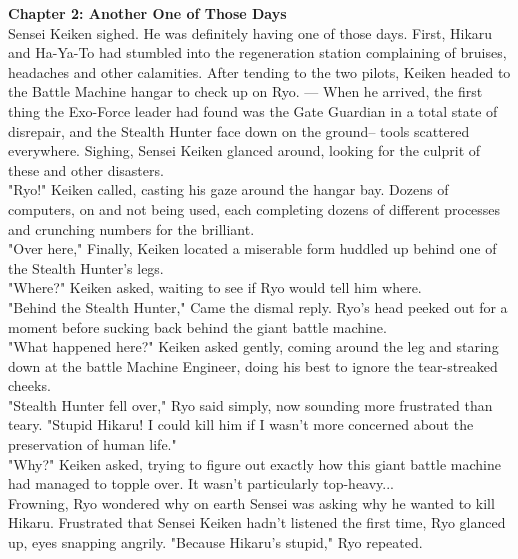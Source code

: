 \documentclass[11pt,twoside,a4paper]{book}
\begin{document}
\begin{multicols*}{2}

\textbf{\large Chapter 2: Another One of Those Days} ~\\

Sensei Keiken sighed. He was definitely having one of those days. First, Hikaru and Ha-Ya-To had stumbled into the regeneration station complaining of bruises, headaches and other calamities. After tending to the two pilots, Keiken headed to the Battle Machine hangar to check up on Ryo. --- When he arrived, the first thing the Exo-Force leader had found was the Gate Guardian in a total state of disrepair, and the Stealth Hunter face down on the ground-- tools scattered everywhere. Sighing, Sensei Keiken glanced around, looking for the culprit of these and other disasters. ~\\

"Ryo!" Keiken called, casting his gaze around the hangar bay. Dozens of computers, on and not being used, each completing dozens of different processes and crunching numbers for the brilliant. ~\\

"Over here," Finally, Keiken located a miserable form huddled up behind one of the Stealth Hunter's legs. ~\\

"Where?" Keiken asked, waiting to see if Ryo would tell him where. ~\\

"Behind the Stealth Hunter," Came the dismal reply. Ryo's head peeked out for a moment before sucking back behind the giant battle machine. ~\\

"What happened here?" Keiken asked gently, coming around the leg and staring down at the battle Machine Engineer, doing his best to ignore the tear-streaked cheeks. ~\\

"Stealth Hunter fell over," Ryo said simply, now sounding more frustrated than teary. "Stupid Hikaru! I could kill him if I wasn't more concerned about the preservation of human life." ~\\

"Why?" Keiken asked, trying to figure out exactly how this giant battle machine had managed to topple over. It wasn't particularly top-heavy... ~\\

Frowning, Ryo wondered why on earth Sensei was asking why he wanted to kill Hikaru. Frustrated that Sensei Keiken hadn't listened the first time, Ryo glanced up, eyes snapping angrily. "Because Hikaru's stupid," Ryo repeated. ~\\


\end{multicols*}
\end{document}
